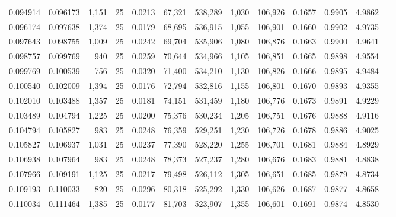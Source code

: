\begin{tabular}{rrrrrrrrrrrrr}
0.094914 & 0.096173 & 1,151 &  25 &                                     0.0213 &  67,321 & 538,289 &   1,030 & 106,926 & 0.1657 & 0.9905 & 4.9862 \\
0.096174 & 0.097638 & 1,374 &  25 &                                     0.0179 &  68,695 & 536,915 &   1,055 & 106,901 & 0.1660 & 0.9902 & 4.9735 \\
0.097643 & 0.098755 & 1,009 &  25 &                                     0.0242 &  69,704 & 535,906 &   1,080 & 106,876 & 0.1663 & 0.9900 & 4.9641 \\
0.098757 & 0.099769 &   940 &  25 &                                     0.0259 &  70,644 & 534,966 &   1,105 & 106,851 & 0.1665 & 0.9898 & 4.9554 \\
0.099769 & 0.100539 &   756 &  25 &                                     0.0320 &  71,400 & 534,210 &   1,130 & 106,826 & 0.1666 & 0.9895 & 4.9484 \\
0.100540 & 0.102009 & 1,394 &  25 &                                     0.0176 &  72,794 & 532,816 &   1,155 & 106,801 & 0.1670 & 0.9893 & 4.9355 \\
0.102010 & 0.103488 & 1,357 &  25 &                                     0.0181 &  74,151 & 531,459 &   1,180 & 106,776 & 0.1673 & 0.9891 & 4.9229 \\
0.103489 & 0.104794 & 1,225 &  25 &                                     0.0200 &  75,376 & 530,234 &   1,205 & 106,751 & 0.1676 & 0.9888 & 4.9116 \\
0.104794 & 0.105827 &   983 &  25 &                                     0.0248 &  76,359 & 529,251 &   1,230 & 106,726 & 0.1678 & 0.9886 & 4.9025 \\
0.105827 & 0.106937 & 1,031 &  25 &                                     0.0237 &  77,390 & 528,220 &   1,255 & 106,701 & 0.1681 & 0.9884 & 4.8929 \\
0.106938 & 0.107964 &   983 &  25 &                                     0.0248 &  78,373 & 527,237 &   1,280 & 106,676 & 0.1683 & 0.9881 & 4.8838 \\
0.107966 & 0.109191 & 1,125 &  25 &                                     0.0217 &  79,498 & 526,112 &   1,305 & 106,651 & 0.1685 & 0.9879 & 4.8734 \\
0.109193 & 0.110033 &   820 &  25 &                                     0.0296 &  80,318 & 525,292 &   1,330 & 106,626 & 0.1687 & 0.9877 & 4.8658 \\
0.110034 & 0.111464 & 1,385 &  25 &                                     0.0177 &  81,703 & 523,907 &   1,355 & 106,601 & 0.1691 & 0.9874 & 4.8530 \\

\end{tabular}
